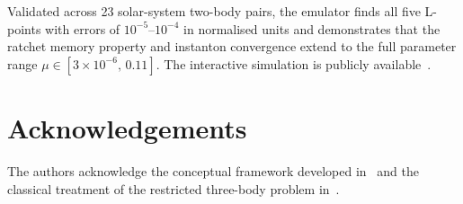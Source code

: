 \documentclass[10pt,twocolumn]{article}
\begin{document}
Validated across 23 solar-system two-body pairs, the emulator finds all five
L-points with errors of $10^{-5}$--$10^{-4}$ in normalised units and
demonstrates that the ratchet memory property and instanton convergence extend
to the full parameter range $\mu\in[3\times10^{-6},\,0.11]$.
The interactive simulation is publicly available~\cite{github2026}.

\section*{Acknowledgements}

The authors acknowledge the conceptual framework developed
in~\cite{diventra2022} and the classical treatment of the restricted
three-body problem in~\cite{szebehely1967}.
\end{document}
